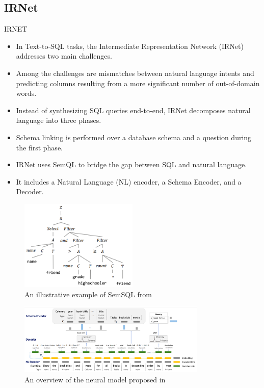 \subsection{IRNet}

IRNET \cite{DBLP:journals/corr/abs-1905-08205}

\begin{itemize}
    \item In Text-to-SQL tasks, the Intermediate Representation Network (IRNet) addresses two main challenges.
    \item Among the challenges are mismatches between natural language intents and predicting columns resulting from a more significant number of out-of-domain words.
    \item Instead of synthesizing SQL queries end-to-end, IRNet decomposes natural language into three phases.
    \item Schema linking is performed over a database schema and a question during the first phase.
    \item IRNet uses SemQL to bridge the gap between SQL and natural language.
    \item It includes a Natural Language (NL) encoder, a Schema Encoder, and a Decoder.
\end{itemize}

\begin{figure}[htb]
    \centering
    \includegraphics[width=0.5\textwidth]{pics/IRNet/illustrative_SemSQL}
    \caption{An illustrative example of SemSQL from \cite{DBLP:journals/corr/abs-1905-08205}}
    \label{fig:illustrative_SemSQL}
\end{figure}

\begin{figure}[htb]
    \centering
    \includegraphics[width=0.8\textwidth]{pics/IRNet/overview}
    \caption{An overview of the neural model proposed in \cite{DBLP:journals/corr/abs-1905-08205}}
    \label{fig:overview}
\end{figure}

